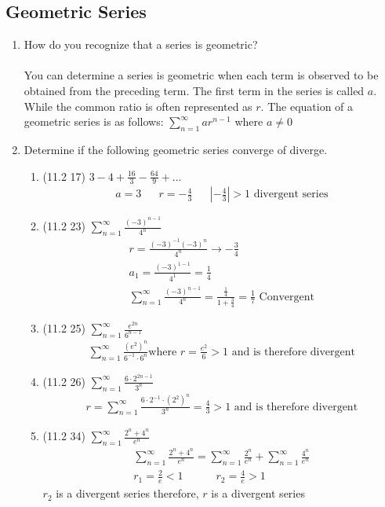 \documentclass[12pt]{article}
\begin{document}
    \subsection{Geometric Series}
    \begin{enumerate}
        \addtocounter{enumi}{5}\item How do you recognize that a series is geometric?
        \\\\ You can determine a series is geometric when each term is observed to be obtained from the preceding term. The first term in the series is called $a$. While the common ratio is often represented as $r$. The equation of a geometric series is as follows: $\sum^\infty_{n=1}ar^{n-1}$ where $a\neq 0$
        \item Determine if the following geometric series converge of diverge.
        \begin{enumerate}
            \item (11.2 17) 
            $3-4+\frac{16}{3}-\frac{64}{9}+...$
            \begin{align*}
                a=3 && r=-\frac{4}{3} && \text{$\left|-\frac{4}{3}\right|>1$ divergent series}
            \end{align*}
            \item (11.2 23) 
            $\sum_{n=1}^\infty\frac{(-3)^{n-1}}{4^n}$
            \begin{align*}
                r = \frac{(-3)^{-1}(-3)^{n}}{4^n}\to-\frac{3}{4}\\
                a_1 = \frac{(-3)^{1-1}}{4^1} = \frac{1}{4}\\
                \sum_{n=1}^\infty\frac{(-3)^{n-1}}{4^n}=\frac{\frac{1}{4}}{1+\frac{3}{4}}=\frac{1}{7} \text{ Convergent}
            \end{align*}
            \item (11.2 25)
            $\sum_{n=1}^\infty\frac{e^{2n}}{6^{n-1}}$
            \begin{align*}
                \sum_{n=1}^\infty\frac{(e^2)^{n}}{6^{-1}\cdot6^{n}} \text{where } r = \frac{e^2}{6} > 1 \text{ and is therefore divergent}
            \end{align*}
            \item (11.2 26)
            $\sum_{n=1}^\infty\frac{6\cdot2^{2n-1}}{3^n}$
            \begin{align*}
                r=\sum_{n=1}^\infty\frac{6\cdot2^{-1}\cdot(2^2)^n}{3^n}=\frac{4}{3} > 1 \text{ and is therefore divergent}
            \end{align*}
            \newpage\item (11.2 34)
                $\sum_{n=1}^\infty\frac{2^n+4^n}{e^n}$
            \begin{align*}
            \sum_{n=1}^\infty\frac{2^n+4^n}{e^n} = \sum_{n=1}^\infty\frac{2^n}{e^n} + \sum_{n=1}^\infty\frac{4^n}{e^n}\\
            r_1 = \frac{2}{e} < 1 \quad\quad\quad r_2 = \frac{4}{e} > 1
            \end{align*}
            $r_2$ is a divergent series therefore, $r$ is a divergent series
        \end{enumerate}
    \end{enumerate}
\end{document}
